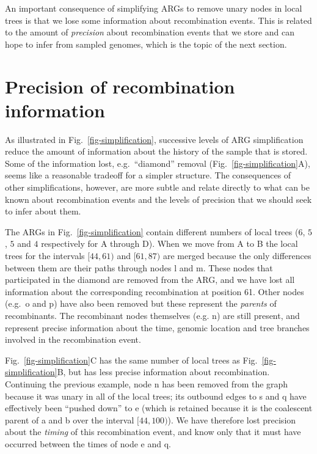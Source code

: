\documentclass{article}
\newcommand{\noderef}[1]{\textsf{#1}}
\begin{document}
An important consequence of simplifying ARGs to remove
unary nodes in local trees is that we lose some information
about recombination
events. This is related to the amount of \emph{precision} about
recombination events that we store and
can hope to infer from sampled genomes, which is the topic of the next
section.

\section*{Precision of recombination information}
\label{sec-precision}
As illustrated in Fig.~\ref{fig-simplification}, successive levels
of ARG simplification reduce the amount of information about the
history of the sample that is stored. Some of the information lost,
e.g.\ ``diamond'' removal (Fig.~\ref{fig-simplification}A),
seems like a reasonable tradeoff for a simpler structure.
The consequences of other simplifications, however, are
more subtle and relate directly to what can be known about
recombination events and the levels of precision that
we should seek to infer about them.

The ARGs in Fig.~\ref{fig-simplification} contain different
numbers of local trees ($6$, $5$, $5$ and $4$ respectively for A through
D). When we move from A to B the local trees
for the intervals $[44,61)$ and $[61,87)$ are merged because
the only differences between them are their paths through
nodes \noderef{l} and \noderef{m}. These nodes that participated
in the diamond are removed from the ARG, and we have lost
all information about the corresponding recombination at
position 61. Other nodes (e.g.\ \noderef{o} and \noderef{p})
have also been removed but these represent the \emph{parents}
of recombinants. The recombinant nodes themselves
(e.g. \noderef{n}) are still present, and represent precise
information about the time, genomic location and tree
branches involved
in the recombination event.

Fig.~\ref{fig-simplification}C has the same number of local trees
as Fig.~\ref{fig-simplification}B, but has less precise information
about recombination. Continuing the previous example, node
\noderef{n} has been removed from the graph because it was unary
in all of the local trees; its outbound edges to \noderef{s}
and \noderef{q} have effectively been ``pushed down''
to \noderef{e} (which is retained because it is the coalescent
parent of \noderef{a} and \noderef{b} over the interval
$[44, 100)$). We
have therefore lost precision about
the \emph{timing} of this recombination event, and know only
that it must have occurred between the times of node \noderef{e}
and \noderef{q}.
\end{document}
